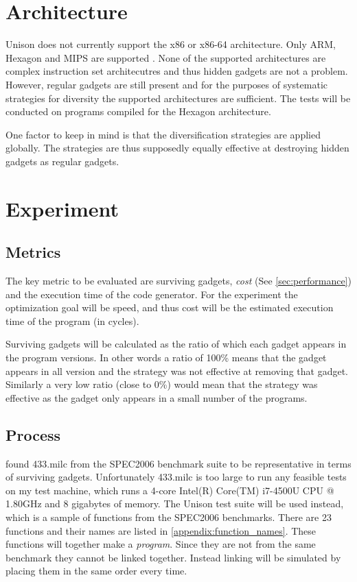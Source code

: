\section{Architecture}
\label{sec:arch}

Unison does not currently support the x86 or x86-64 architecture. Only ARM, Hexagon and MIPS
are supported \cite{unison-src}. None of the supported architectures are complex instruction
set architecutres and thus hidden gadgets are not a problem. However, regular gadgets are
still present and for the purposes of systematic strategies for diversity the supported
architectures are sufficient. The tests will be conducted on programs compiled for the
Hexagon architecture.

One factor to keep in mind is that the diversification strategies are applied globally.
The strategies are thus supposedly equally effective at destroying hidden gadgets as
regular gadgets.

\section{Experiment}

\subsection{Metrics}

The key metric to be evaluated are surviving gadgets, \textit{cost} (See
\ref{sec:performance}) and the execution time of the code generator. For the experiment
the optimization goal will be speed, and thus cost will be the estimated execution time of
the program (in cycles).

Surviving gadgets will be calculated as the ratio of which each gadget appears in the program
versions. In other words a ratio of 100\% means that the gadget appears in all version
and the strategy was not effective at removing that gadget. Similarly a very low ratio
(close to 0\%) would mean that the strategy was effective as the gadget only appears in
a small number of the programs.

\subsection{Process}

\textcite{large-scale-automated} found 433.milc from the SPEC2006 benchmark suite to be
representative in terms of surviving gadgets. Unfortunately 433.milc is too large to run
any feasible tests on my test machine, which runs a 4-core Intel(R) Core(TM) i7-4500U CPU
@ 1.80GHz and 8 gigabytes of memory. The Unison test suite will be used instead, which is
a sample of functions from the SPEC2006 benchmarks. There are 23 functions and their names
are listed in \ref{appendix:function_names}. These functions will together make a
\textit{program}. Since they are not from the same benchmark they cannot be linked
together. Instead linking will be simulated by placing them in the same order every time.

